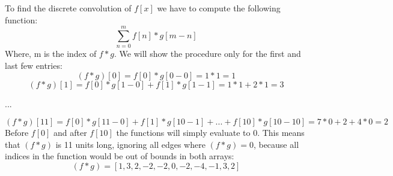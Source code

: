 To find the discrete convolution of $f[x]$ we have to compute the following function:
$$
\sum_{n=0}^mf[n]*g[m-n]
$$
Where, m is the index of $f*g$. We will show the procedure only for the first and last few entries:
$$
(f*g)[0] = f[0]*g[0-0] = 1*1 = 1
$$
$$
(f*g)[1] = f[0]*g[1-0] + f[1]*g[1-1] = 1*1+2*1 = 3
$$
\begin{center}
...
\end{center}
$
(f*g)[11] = f[0]*g[11-0] + f[1]*g[10-1] + ...+ f[10]*g[10-10] = 7*0+2+4*0= 2
$\\
Before $f[0]$ and after $f[10]$ the functions will simply evaluate to $0$. This means that $(f*g)$ is 11 units long, ignoring all edges where $(f*g)=0$, because all indices in the function would be out of bounds in both arrays:
$$(f*g) = [1,3,2,-2,-2,0,-2,-4,-1,3,2]$$